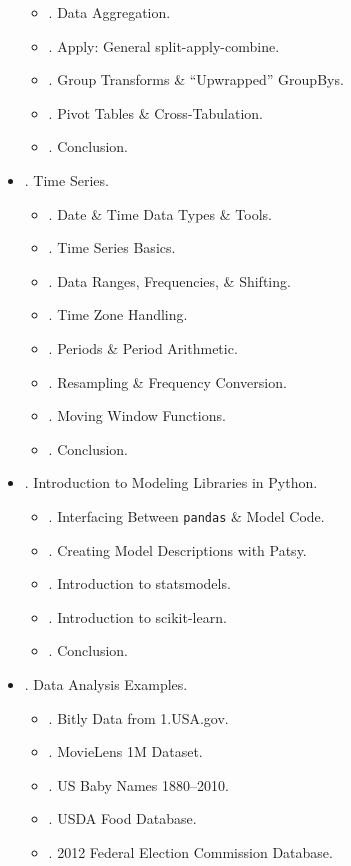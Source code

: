 \documentclass{article}
\begin{document}
\begin{itemize}
\begin{itemize}
		\item {. Data Aggregation.}
		\item {. Apply: General split-apply-combine.}
		\item {. Group Transforms \& ``Upwrapped'' GroupBys.}
		\item {. Pivot Tables \& Cross-Tabulation.}
		\item {. Conclusion.}
	\end{itemize}
	\item {. Time Series.}
	\begin{itemize}
		\item {. Date \& Time Data Types \& Tools.}
		\item {. Time Series Basics.}
		\item {. Data Ranges, Frequencies, \& Shifting.}
		\item {. Time Zone Handling.}
		\item {. Periods \& Period Arithmetic.}
		\item {. Resampling \& Frequency Conversion.}
		\item {. Moving Window Functions.}
		\item {. Conclusion.}
	\end{itemize}
	\item {. Introduction to Modeling Libraries in Python.}
	\begin{itemize}
		\item {. Interfacing Between {\tt pandas} \& Model Code.}
		\item {. Creating Model Descriptions with Patsy.}
		\item {. Introduction to statsmodels.}
		\item {. Introduction to scikit-learn.}
		\item {. Conclusion.}
	\end{itemize}
	\item {. Data Analysis Examples.}
	\begin{itemize}
		\item {. Bitly Data from 1.USA.gov.}
		\item {. MovieLens 1M Dataset.}
		\item {. US Baby Names 1880--2010.}
		\item {. USDA Food Database.}
		\item {. 2012 Federal Election Commission Database.}

\end{itemize}
\end{itemize}
\end{document}

